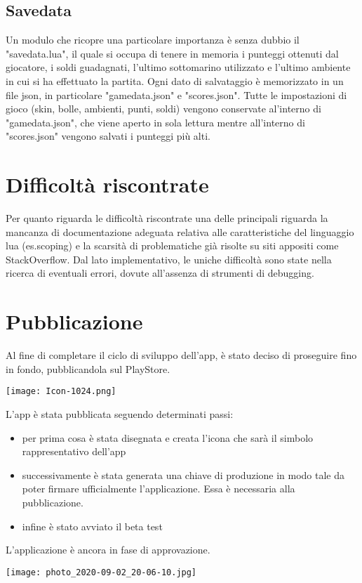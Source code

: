 \documentclass[12pt]{article}
\begin{document}
\subsection{Savedata}
Un modulo che ricopre una particolare importanza è senza dubbio il "savedata.lua", il quale si occupa di tenere in memoria i punteggi ottenuti dal giocatore, i soldi guadagnati, l'ultimo sottomarino utilizzato e l'ultimo ambiente in cui si ha effettuato la partita. Ogni dato di salvataggio è memorizzato in un file json, in particolare "gamedata.json" e "scores.json". 
Tutte le impostazioni di gioco  (skin, bolle, ambienti, punti, soldi) vengono conservate al'interno di "gamedata.json", che viene aperto in sola lettura mentre all'interno di "scores.json" vengono salvati i punteggi più alti. 

\section{Difficoltà riscontrate}
Per quanto riguarda le difficoltà riscontrate una delle principali riguarda la mancanza di documentazione adeguata relativa alle caratteristiche del linguaggio lua (es.scoping) e la scarsità di problematiche già risolte su siti appositi come StackOverflow. 
Dal lato implementativo, le uniche difficoltà sono state nella ricerca di eventuali errori, dovute all'assenza di strumenti di debugging.

\section{Pubblicazione}
Al fine di completare il ciclo di sviluppo dell'app, è stato deciso di proseguire fino in fondo, pubblicandola sul PlayStore.
\begin{center}
    \texttt{[image: Icon-1024.png]}
\end{center}

L'app è stata pubblicata seguendo determinati passi:
\begin{itemize}
    \item per prima cosa è stata disegnata e creata l'icona che sarà il simbolo rappresentativo dell'app
    \item successivamente è stata generata una chiave di produzione in modo tale da poter firmare ufficialmente l'applicazione. Essa è necessaria alla pubblicazione.
    \item infine è stato avviato il beta test
\end{itemize}

L'applicazione è ancora in fase di approvazione.
\begin{center}
    \texttt{[image: photo\_2020-09-02\_20-06-10.jpg]}
\end{center}
\end{document}
